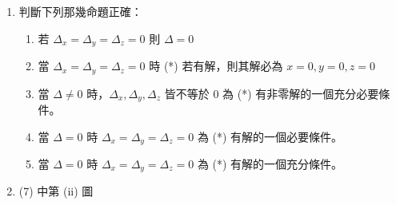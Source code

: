 \begin{enumerate}[label=(\arabic*), resume, leftmargin=2em]
\begin{figure}[H]
\begin{subfigure}[b]{0.34\textwidth}
  \caption*{(iii)}
  \end{subfigure}
  \caption{空間向量幾何關係示意圖}
  \label{fig:b3s-a2-1}
  \end{figure}

  \begin{enumerate}[label=\textcircled{\arabic*}, leftmargin=2em]
    \item $\Delta = 0$ 且 $\Delta_x = \Delta_y = \Delta_z = 0$
    \item $\Delta = 0$ 且 $\Delta_x = 0, \Delta_y = 0, \Delta_z \neq 0$
    \item $\Delta \neq 0$ 且 $\Delta_x = 0, \Delta_y \neq 0, \Delta_z = 0$
    \item $\Delta = 0$ 且 $\Delta_x \neq 0, \Delta_y \neq 0, \Delta_z = 0$
    \item $\Delta \neq 0$ 且 $\Delta_x = 0, \Delta_y = 0, \Delta_z \neq 0$
  \end{enumerate}

  \item 判斷下列那幾命題正確：
  \begin{enumerate}[label=\textcircled{\arabic*}, leftmargin=2em]
    \item 若 $\Delta_x = \Delta_y = \Delta_z = 0$ 則 $\Delta = 0$
    \item 當 $\Delta_x = \Delta_y = \Delta_z = 0$ 時 (*) 若有解，則其解必為 $x = 0, y = 0, z = 0$
    \item 當 $\Delta \neq 0$ 時，$\Delta_x, \Delta_y, \Delta_z$ 皆不等於 0 為 (*) 有非零解的一個充分必要條件。
    \item 當 $\Delta = 0$ 時 $\Delta_x = \Delta_y = \Delta_z = 0$ 為 (*) 有解的一個必要條件。
    \item 當 $\Delta = 0$ 時 $\Delta_x = \Delta_y = \Delta_z = 0$ 為 (*) 有解的一個充分條件。
  \end{enumerate}

  \item (7) 中第 (ii) 圖


\end{enumerate}
